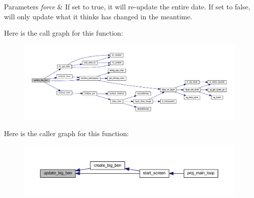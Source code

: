 \begin{DoxyParams}{Parameters}
{\em force} & If set to true, it will re-\/update the entire date. If set to false, will only update what it thinks has changed in the meantime. \\
\hline
\end{DoxyParams}
Here is the call graph for this function\+:
\nopagebreak
\begin{figure}[H]
\begin{center}
\leavevmode
\includegraphics[width=350pt]{group__clock_gac56b75476d51e272a9efcbb174ed7bf8_cgraph}
\end{center}
\end{figure}
Here is the caller graph for this function\+:\nopagebreak
\begin{figure}[H]
\begin{center}
\leavevmode
\includegraphics[width=350pt]{group__clock_gac56b75476d51e272a9efcbb174ed7bf8_icgraph}
\end{center}
\end{figure}
